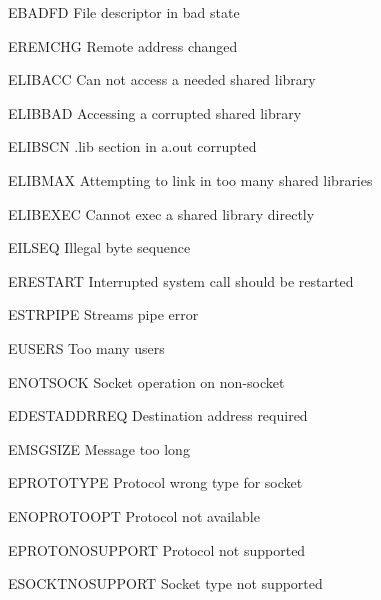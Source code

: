 \begin{datadesc}{EBADFD} File descriptor in bad state \end{datadesc}
\begin{datadesc}{EREMCHG} Remote address changed \end{datadesc}
\begin{datadesc}{ELIBACC} Can not access a needed shared library \end{datadesc}
\begin{datadesc}{ELIBBAD} Accessing a corrupted shared library \end{datadesc}
\begin{datadesc}{ELIBSCN} .lib section in a.out corrupted \end{datadesc}
\begin{datadesc}{ELIBMAX} Attempting to link in too many shared libraries \end{datadesc}
\begin{datadesc}{ELIBEXEC} Cannot exec a shared library directly \end{datadesc}
\begin{datadesc}{EILSEQ} Illegal byte sequence \end{datadesc}
\begin{datadesc}{ERESTART} Interrupted system call should be restarted \end{datadesc}
\begin{datadesc}{ESTRPIPE} Streams pipe error \end{datadesc}
\begin{datadesc}{EUSERS} Too many users \end{datadesc}
\begin{datadesc}{ENOTSOCK} Socket operation on non-socket \end{datadesc}
\begin{datadesc}{EDESTADDRREQ} Destination address required \end{datadesc}
\begin{datadesc}{EMSGSIZE} Message too long \end{datadesc}
\begin{datadesc}{EPROTOTYPE} Protocol wrong type for socket \end{datadesc}
\begin{datadesc}{ENOPROTOOPT} Protocol not available \end{datadesc}
\begin{datadesc}{EPROTONOSUPPORT} Protocol not supported \end{datadesc}
\begin{datadesc}{ESOCKTNOSUPPORT} Socket type not supported \end{datadesc}

